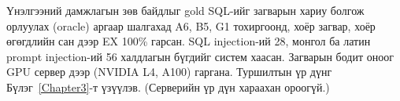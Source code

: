 Үнэлгээний дамжлагын зөв байдлыг gold SQL-ийг загварын хариу болгож орлуулах (oracle) аргаар шалгахад A6, B5, G1
тохиргоонд, хоёр загвар, хоёр өгөгдлийн сан дээр EX 100\% гарсан. SQL injection-ий 28, монгол ба латин prompt
injection-ий 56 халдлагын бүгдийг систем хаасан. Загварын бодит оноог GPU сервер дээр (NVIDIA L4, A100) гаргана.
\ifnum{}
Туршилтын үр дүнг Бүлэг~\ref{Chapter3}-т үзүүлэв.
\else
(Серверийн үр дүн хараахан ороогүй.)
\fi
